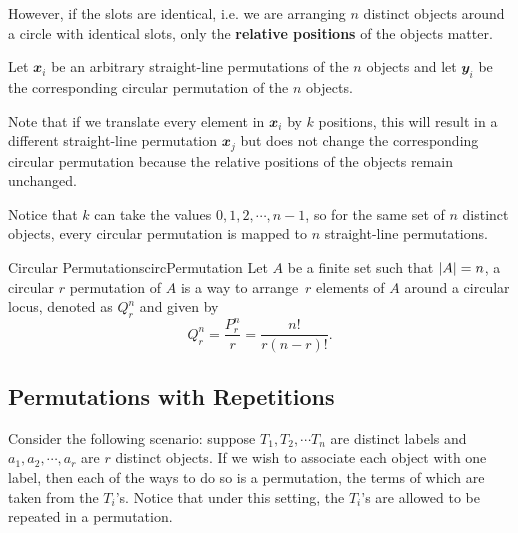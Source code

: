 \documentclass[math]{amznotes}
\theoremstyle{remark}
\begin{document}
However, if the slots are identical, i.e. we are arranging $n$ distinct objects around a circle with identical slots, only the \textbf{relative positions} of the objects matter.

Let $\mathbfit{x}_i$ be an arbitrary straight-line permutations of the $n$ objects and let $\mathbfit{y}_i$ be the corresponding circular permutation of the $n$ objects.

Note that if we translate every element in $\mathbfit{x}_i$ by $k$ positions, this will result in a different straight-line permutation $\mathbfit{x}_j$ but does not change the corresponding circular permutation because the relative positions of the objects remain unchanged.

Notice that $k$ can take the values $0, 1, 2, \cdots, n - 1$, so for the same set of $n$ distinct objects, every circular permutation is mapped to $n$ straight-line permutations.
\begin{dfnbox}{Circular Permutations}{circPermutation}
    Let $A$ be a finite set such that ${\left\lvert {A} \right\rvert} = n$, a circular $r$ permutation of $A$ is a way to arrange~$r$ elements of $A$ around a circular locus, denoted as $Q^n_r$ and given by
    \begin{equation*}
        Q^n_r = \frac{P^n_r}{r} = \frac{n!}{r(n - r)!}.
    \end{equation*}
\end{dfnbox}

\subsection{Permutations with Repetitions}
Consider the following scenario: suppose $T_1, T_2, \cdots T_n$ are distinct labels and $a_1, a_2, \cdots, a_r$ are $r$ distinct objects. If we wish to associate each object with one label, then each of the ways to do so is a permutation, the terms of which are taken from the $T_i$'s. Notice that under this setting, the $T_i$'s are allowed to be repeated in a permutation.
\end{document}
